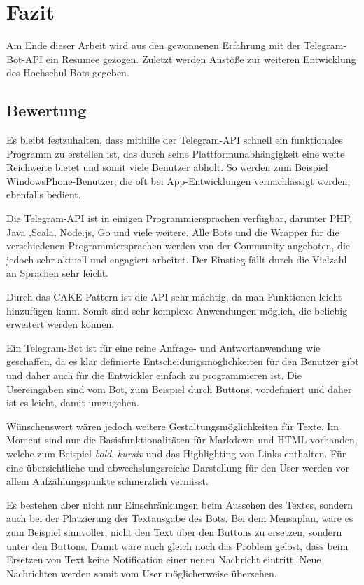 \chapter{Fazit}
Am Ende dieser Arbeit wird aus den gewonnenen Erfahrung mit der Telegram-Bot-API ein Resumee gezogen. Zuletzt werden Anstöße zur weiteren Entwicklung des Hochschul-Bots gegeben.

\section{Bewertung}
Es bleibt festzuhalten, dass mithilfe der Telegram-API schnell ein funktionales Programm zu erstellen ist, das durch seine Plattformunabhängigkeit eine weite Reichweite bietet und somit viele Benutzer abholt. So werden zum Beispiel WindowsPhone-Benutzer, die oft bei App-Entwicklungen vernachlässigt werden, ebenfalls bedient.

Die Telegram-API ist in einigen Programmiersprachen verfügbar, darunter PHP, Java ,Scala, Node.js, Go und viele weitere. Alle Bots und die Wrapper für die verschiedenen Programmiersprachen werden von der Community angeboten, die jedoch sehr aktuell und engagiert arbeitet. Der Einstieg fällt durch die Vielzahl an Sprachen sehr leicht.

Durch das CAKE-Pattern ist die API sehr mächtig, da man Funktionen leicht hinzufügen kann. Somit sind sehr komplexe Anwendungen möglich, die beliebig erweitert werden können.

Ein Telegram-Bot ist für eine reine Anfrage- und Antwortanwendung wie geschaffen, da es klar definierte Entscheidungsmöglichkeiten für den Benutzer gibt und daher auch für die Entwickler einfach zu programmieren ist. Die Usereingaben sind vom Bot, zum Beispiel durch Buttons, vordefiniert und daher ist es leicht, damit umzugehen.

Wünschenswert wären jedoch weitere Gestaltungsmöglichkeiten für Texte. Im Moment sind nur die Basisfunktionalitäten für Markdown und HTML vorhanden, welche zum Beispiel \emph{bold}, \emph{kursiv} und das Highlighting von Links enthalten.
Für eine übersichtliche und abwechslungsreiche Darstellung für den User werden vor allem Aufzählungspunkte schmerzlich vermisst.

Es bestehen aber nicht nur Einschränkungen beim Aussehen des Textes, sondern auch bei der Platzierung der Textausgabe des Bots.
Bei dem Mensaplan, wäre es zum Beispiel sinnvoller, nicht den Text über den Buttons zu ersetzen, sondern unter den Buttons. Damit wäre auch gleich noch das Problem gelöst, dass beim Ersetzen von Text keine Notification einer neuen Nachricht eintritt. Neue Nachrichten werden somit vom User möglicherweise übersehen.

